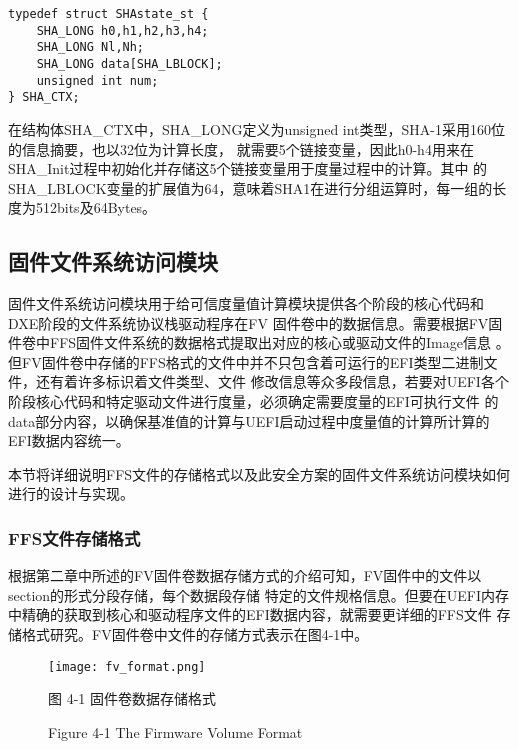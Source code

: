 \begin{lstlisting}
typedef struct SHAstate_st {
    SHA_LONG h0,h1,h2,h3,h4;
    SHA_LONG Nl,Nh;
    SHA_LONG data[SHA_LBLOCK];
    unsigned int num;
} SHA_CTX;
\end{lstlisting}

在结构体SHA\_CTX中，SHA\_LONG定义为unsigned int类型，SHA-1采用160位的信息摘要，也以32位为计算长度，
就需要5个链接变量，因此h0-h4用来在SHA\_Init过程中初始化并存储这5个链接变量用于度量过程中的计算。其中
的SHA\_LBLOCK变量的扩展值为64，意味着SHA1在进行分组运算时，每一组的长度为512bits及64Bytes。

\subsection{固件文件系统访问模块}
固件文件系统访问模块用于给可信度量值计算模块提供各个阶段的核心代码和DXE阶段的文件系统协议栈驱动程序在FV
固件卷中的数据信息。需要根据FV固件卷中FFS固件文件系统的数据格式提取出对应的核心或驱动文件的Image信息
\cite{english2}。
但FV固件卷中存储的FFS格式的文件中并不只包含着可运行的EFI类型二进制文件，还有着许多标识着文件类型、文件
修改信息等众多段信息，若要对UEFI各个阶段核心代码和特定驱动文件进行度量，必须确定需要度量的EFI可执行文件
的data部分内容，以确保基准值的计算与UEFI启动过程中度量值的计算所计算的EFI数据内容统一。
\par 本节将详细说明FFS文件的存储格式以及此安全方案的固件文件系统访问模块如何进行的设计与实现。

\subsubsection{FFS文件存储格式}
根据第二章中所述的FV固件卷数据存储方式的介绍可知，FV固件中的文件以section的形式分段存储，每个数据段存储
特定的文件规格信息。但要在UEFI内存中精确的获取到核心和驱动程序文件的EFI数据内容，就需要更详细的FFS文件
存储格式研究。FV固件卷中文件的存储方式表示在图4-1中。

\begin{figure}[htb]
    \vspace{0cm}   
    \setlength{\abovecaptionskip}{0.3cm}
	\centering
    \texttt{[image: fv\_format.png]}
    \caption*{图 4-1 固件卷数据存储格式}
    \setlength{\belowcaptionskip}{-0.7cm}
    \caption*{Figure 4-1 The Firmware Volume Format}
\end{figure}

